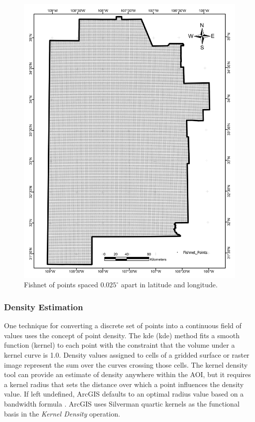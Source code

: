 \begin{figure}[htp]
\centering
\includegraphics[scale=.50]{templates/images/Figure-Fishnet.pdf}
\caption[Fishnet point mesh]{Fishnet of points spaced $0.025^\circ$ apart in latitude and longitude.} 
\label{fig:fishnet}
\end{figure}

\subsubsection{Density Estimation}

One technique for converting a discrete set of points into a continuous field of values uses the concept of point density. The \acrlong{kde} (\acrshort{kde}) method fits a smooth function (kernel) to each point with the constraint that the volume under a kernel curve is 1.0. Density values assigned to cells of a gridded surface or raster image represent the sum over the curves crossing those cells. The kernel density tool can provide an estimate of density anywhere within the AOI, but it requires a kernel radius that sets the distance over which a point influences the density value. If left undefined, ArcGIS defaults to an optimal radius value based on a bandwidth formula \citep{esri_kernel_2021}. ArcGIS uses Silverman quartic kernels \citep{esri_kernel_2021,silverman_density_1986} as the functional basis in the \textit{Kernel Density} operation.

